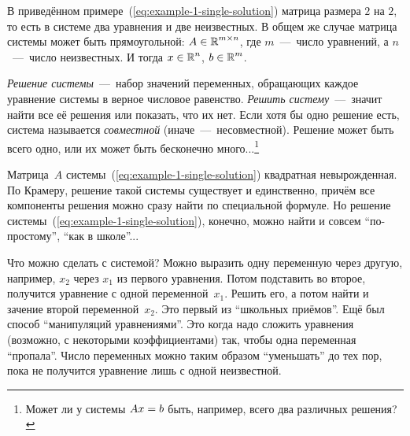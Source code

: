 \documentclass[a4paper,12pt]{article}
\begin{document}
  В приведённом примере~(\ref{eq:example-1-single-solution}) матрица размера $2$ на $2$, то есть в системе два уравнения и две неизвестных.
  В общем же случае матрица системы может быть прямоугольной: $A \hm\in \RR^{m\times n}$, где $m$~---~число уравнений, а $n$~---~число неизвестных.
  И тогда $x \hm\in \RR^n$, $b \hm\in \RR^m$.

  \emph{Решение системы}~---~набор значений переменных, обращающих каждое уравнение системы в верное числовое равенство.
  \emph{Решить систему}~---~значит найти все её решения или показать, что их нет.
  Если хотя бы одно решение есть, система называется \emph{совместной} (иначе~---~несовместной).
  Решение может быть всего одно, или их может быть бесконечно много...\footnote{Может ли у системы $Ax \hm= b$ быть, например, всего два различных решения?}

  Матрица~$A$ системы~(\ref{eq:example-1-single-solution}) квадратная невырожденная.
  По Крамеру, решение такой системы существует и единственно, причём все компоненты решения можно сразу найти по специальной формуле.
  Но решение системы~(\ref{eq:example-1-single-solution}), конечно, можно найти и совсем ``по-простому'', ``как в школе''...
  
  Что можно сделать с системой?
  Можно выразить одну переменную через другую, например, $x_2$ через $x_1$ из первого уравнения.
  Потом подставить во второе, получится уравнение с одной переменной~$x_1$.
  Решить его, а потом найти и зачение второй переменной~$x_2$.
  Это первый из ``школьных приёмов''.
  Ещё был способ ``манипуляций уравнениями''.
  Это когда надо сложить уравнения (возможно, с некоторыми коэффициентами) так, чтобы одна переменная ``пропала''.
  Число переменных можно таким образом ``уменьшать'' до тех пор, пока не получится уравнение лишь с одной неизвестной.
\end{document}
